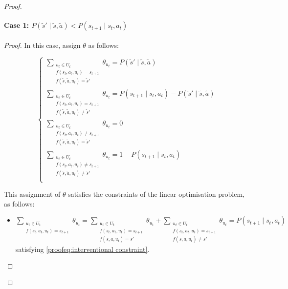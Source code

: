 \begin{proof}
\paragraph{Case 1: $P(\tilde{s}' \mid \tilde{s}, \tilde{a}) < P(s_{t+1} \mid s_t, a_t)$}
\noindent
\begin{proof}
In this case, assign $\theta$ as follows:

\[
\begin{cases}
    \sum_{\substack{u_t \in U_t \\f(s_t, a_t, u_t) = s_{t+1} \\ f(\tilde{s}, \tilde{a}, u_t) = \tilde{s}'}} \theta_{u_t}= P(\tilde{s}' \mid \tilde{s}, \tilde{a})\\
    \sum_{\substack{u_t \in U_t \\f(s_t, a_t, u_t) = s_{t+1} \\ f(\tilde{s}, \tilde{a}, u_t) \neq \tilde{s}'}} \theta_{u_t} = P(s_{t+1} \mid s_t, a_t) - P(\tilde{s}' \mid \tilde{s}, \tilde{a})\\
    \sum_{\substack{u_t \in U_t \\f(s_t, a_t, u_t) \neq s_{t+1} \\ f(\tilde{s}, \tilde{a}, u_t) = \tilde{s}'}} \theta_{u_t} = 0\\
    \sum_{\substack{u_t \in U_t \\f(s_t, a_t, u_t) \neq s_{t+1} \\ f(\tilde{s}, \tilde{a}, u_t) \neq \tilde{s}'}} \theta_{u_t} = 1 - P(s_{t+1} \mid s_t, a_t)\\
\end{cases}
\]

    This assignment of $\theta$ satisfies the constraints of the linear optimisation problem, as follows:

    \begin{itemize}        
        \item $\sum_{\substack{u_t \in U_t \\f(s_t, a_t, u_t) = s_{t+1}}} \theta_{u_t} = \sum_{\substack{u_t \in U_t \\f(s_t, a_t, u_t) = s_{t+1} \\ f(\tilde{s}, \tilde{a}, u_t) = \tilde{s}'}} \theta_{u_t} + \sum_{\substack{u_t \in U_t \\f(s_t, a_t, u_t) = s_{t+1} \\ f(\tilde{s}, \tilde{a}, u_t) \neq \tilde{s}'}} \theta_{u_t} = P(s_{t+1} \mid s_t, a_t)$ \\satisfying \eqref{proofeq:interventional constraint}.


\end{itemize}
\end{proof}
\end{proof}
